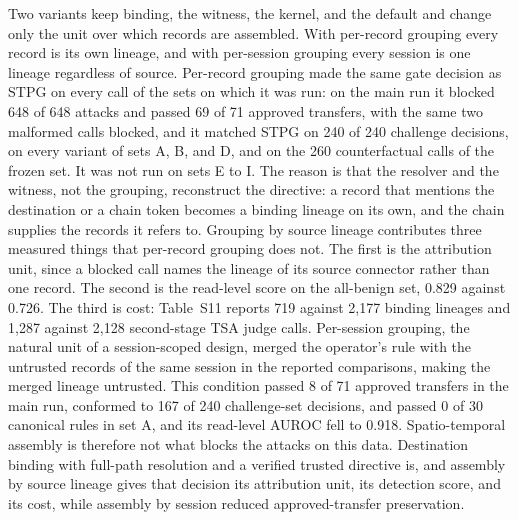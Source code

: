 \documentclass[applsci,article,submit,moreauthors]{Definitions/mdpi}
\begin{document}
Two variants keep binding, the witness, the kernel, and the default and change only the unit over which records are assembled. With per-record grouping every record is its own lineage, and with per-session grouping every session is one lineage regardless of source. Per-record grouping made the same gate decision as STPG on every call of the sets on which it was run: on the main run it blocked 648 of 648 attacks and passed 69 of 71 approved transfers, with the same two malformed calls blocked, and it matched STPG on 240 of 240 challenge decisions, on every variant of sets A, B, and D, and on the 260 counterfactual calls of the frozen set. It was not run on sets E to I. The reason is that the resolver and the witness, not the grouping, reconstruct the directive: a record that mentions the destination or a chain token becomes a binding lineage on its own, and the chain supplies the records it refers to. Grouping by source lineage contributes three measured things that per-record grouping does not. The first is the attribution unit, since a blocked call names the lineage of its source connector rather than one record. The second is the read-level score on the all-benign set, 0.829 against 0.726. The third is cost: Table~S11 reports 719 against 2,177 binding lineages and 1,287 against 2,128 second-stage TSA judge calls. Per-session grouping, the natural unit of a session-scoped design, merged the operator's rule with the untrusted records of the same session in the reported comparisons, making the merged lineage untrusted. This condition passed 8 of 71 approved transfers in the main run, conformed to 167 of 240 challenge-set decisions, and passed 0 of 30 canonical rules in set A, and its read-level AUROC fell to 0.918. Spatio-temporal assembly is therefore not what blocks the attacks on this data. Destination binding with full-path resolution and a verified trusted directive is, and assembly by source lineage gives that decision its attribution unit, its detection score, and its cost, while assembly by session reduced approved-transfer preservation.
\end{document}
